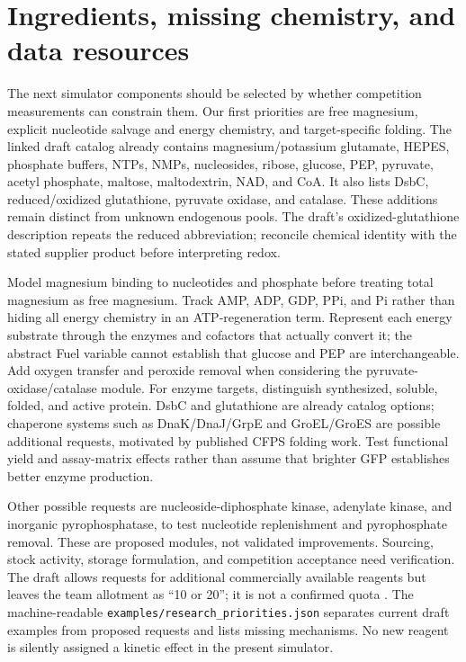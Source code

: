 \section{Ingredients, missing chemistry, and data resources}
The next simulator components should be selected by whether competition
measurements can constrain them. Our first priorities are free magnesium,
explicit nucleotide salvage and energy chemistry, and target-specific folding.
The linked draft catalog already contains magnesium/potassium glutamate,
HEPES, phosphate buffers, NTPs, NMPs, nucleosides, ribose, glucose, PEP, pyruvate,
acetyl phosphate, maltose, maltodextrin, NAD, and CoA. It also lists DsbC,
reduced/oxidized glutathione, pyruvate oxidase, and catalase\cite{competition_rules}.
These additions remain distinct from unknown endogenous pools. The draft's
oxidized-glutathione description repeats the reduced abbreviation; reconcile
chemical identity with the stated supplier product before interpreting redox.

Model magnesium binding to nucleotides and phosphate before treating total
magnesium as free magnesium. Track AMP, ADP, GDP, PPi, and Pi rather than hiding
all energy chemistry in an ATP-regeneration term. Represent each energy substrate
through the enzymes and cofactors that actually convert it; the abstract Fuel
variable cannot establish that glucose and PEP are interchangeable. Add oxygen
transfer and peroxide removal when considering the pyruvate-oxidase/catalase
module. For enzyme targets, distinguish synthesized, soluble, folded, and active
protein. DsbC and glutathione are already catalog options; chaperone systems such
as DnaK/DnaJ/GrpE and GroEL/GroES are possible additional requests, motivated
by published CFPS folding work\cite{hunt}. Test functional yield and assay-matrix
effects rather than assume that brighter GFP establishes better enzyme production.

Other possible requests are nucleoside-diphosphate kinase, adenylate kinase, and
inorganic pyrophosphatase, to test nucleotide replenishment and pyrophosphate
removal. These are proposed modules, not validated improvements. Sourcing,
stock activity, storage formulation, and competition acceptance need verification.
The draft allows requests for additional commercially available reagents but
leaves the team allotment as ``10 or 20''; it is not a confirmed quota
\cite{competition_rules}. The machine-readable
\texttt{examples/research\_priorities.json} separates current draft examples
from proposed requests and lists missing mechanisms. No new reagent is silently
assigned a kinetic effect in the present simulator.

